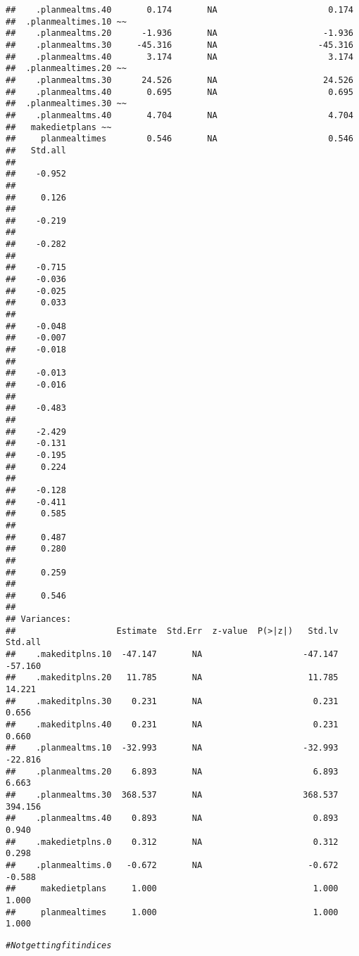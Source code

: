 \documentclass{article}\usepackage[]{graphicx}\usepackage[]{color}
\makeatletter
\newcommand{\hlcom}[1]{\textcolor[rgb]{0.678,0.584,0.686}{\textit{#1}}}%
\newenvironment{kframe}{%
 \def\at@end@of@kframe{}%
 \ifinner\ifhmode%
  \def\at@end@of@kframe{\end{minipage}}%
  \begin{minipage}{\columnwidth}%
 \fi\fi%
 \def\FrameCommand##1{\hskip\@totalleftmargin \hskip-\fboxsep
 \colorbox{shadecolor}{##1}\hskip-\fboxsep
     \hskip-\linewidth \hskip-\@totalleftmargin \hskip\columnwidth}%
 \MakeFramed {\advance\hsize-\width
   \@totalleftmargin\z@ \linewidth\hsize
   \@setminipage}}%
 {\par\unskip\endMakeFramed%
 \at@end@of@kframe}
\newenvironment{knitrout}{}{} %
\makeatother
\begin{document}
\begin{knitrout}
\begin{kframe}
\begin{verbatim}
##    .planmealtms.40       0.174       NA                      0.174
##  .planmealtimes.10 ~~                                             
##    .planmealtms.20      -1.936       NA                     -1.936
##    .planmealtms.30     -45.316       NA                    -45.316
##    .planmealtms.40       3.174       NA                      3.174
##  .planmealtimes.20 ~~                                             
##    .planmealtms.30      24.526       NA                     24.526
##    .planmealtms.40       0.695       NA                      0.695
##  .planmealtimes.30 ~~                                             
##    .planmealtms.40       4.704       NA                      4.704
##   makedietplans ~~                                                
##     planmealtimes        0.546       NA                      0.546
##   Std.all
##          
##    -0.952
##          
##     0.126
##          
##    -0.219
##          
##    -0.282
##          
##    -0.715
##    -0.036
##    -0.025
##     0.033
##          
##    -0.048
##    -0.007
##    -0.018
##          
##    -0.013
##    -0.016
##          
##    -0.483
##          
##    -2.429
##    -0.131
##    -0.195
##     0.224
##          
##    -0.128
##    -0.411
##     0.585
##          
##     0.487
##     0.280
##          
##     0.259
##          
##     0.546
## 
## Variances:
##                    Estimate  Std.Err  z-value  P(>|z|)   Std.lv  Std.all
##    .makeditplns.10  -47.147       NA                    -47.147  -57.160
##    .makeditplns.20   11.785       NA                     11.785   14.221
##    .makeditplns.30    0.231       NA                      0.231    0.656
##    .makeditplns.40    0.231       NA                      0.231    0.660
##    .planmealtms.10  -32.993       NA                    -32.993  -22.816
##    .planmealtms.20    6.893       NA                      6.893    6.663
##    .planmealtms.30  368.537       NA                    368.537  394.156
##    .planmealtms.40    0.893       NA                      0.893    0.940
##    .makedietplns.0    0.312       NA                      0.312    0.298
##    .planmealtims.0   -0.672       NA                     -0.672   -0.588
##     makedietplans     1.000                               1.000    1.000
##     planmealtimes     1.000                               1.000    1.000
\end{verbatim}
\begin{alltt}
\hlcom{#Not getting fit indices}
\end{alltt}
\end{kframe}
\end{knitrout}
\end{document}
